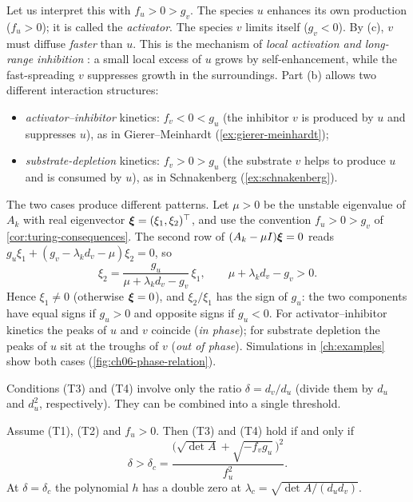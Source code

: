 Let us interpret this with $f_u>0>g_v$. The species $u$ enhances its own production
($f_u>0$); it is called the \emph{activator}. The species $v$ limits itself
($g_v<0$). By (c), $v$ must diffuse \emph{faster} than $u$. This is the mechanism of
\emph{local activation and long-range inhibition} \cite{GiererMeinhardt1972}: a small
local excess of $u$ grows by self-enhancement, while the fast-spreading $v$
suppresses growth in the surroundings. Part (b) allows two different interaction
structures:
\begin{itemize}
  \item \emph{activator--inhibitor} kinetics: $f_v<0<g_u$ (the inhibitor $v$ is
        produced by $u$ and suppresses $u$), as in Gierer--Meinhardt
        (\cref{ex:gierer-meinhardt});
  \item \emph{substrate-depletion} kinetics: $f_v>0>g_u$ (the substrate $v$ helps
        to produce $u$ and is consumed by $u$), as in Schnakenberg
        (\cref{ex:schnakenberg}).
\end{itemize}

\begin{remark}\label{rem:turing-phase}
The two cases produce different patterns. Let $\mu>0$ be the unstable eigenvalue of
$A_k$ with real eigenvector $\boldsymbol{\xi}=(\xi_1,\xi_2)^{\top}$, and use the convention
$f_u>0>g_v$ of \cref{cor:turing-consequences}. The second row of
$(A_k-\mu I)\boldsymbol{\xi}=0$ reads $g_u\xi_1 + (g_v-\lambda_kd_v-\mu)\xi_2=0$, so
\begin{equation*}
  \xi_2 = \frac{g_u}{\mu+\lambda_kd_v-g_v}\,\xi_1,
  \qquad \mu+\lambda_kd_v-g_v>0 .
\end{equation*}
Hence $\xi_1\neq0$ (otherwise $\boldsymbol{\xi}=0$), and $\xi_2/\xi_1$ has the sign of $g_u$:
the two components have equal signs if $g_u>0$ and opposite signs if $g_u<0$.
For activator--inhibitor kinetics the
peaks of $u$ and $v$ coincide (\emph{in phase}); for substrate depletion the peaks of
$u$ sit at the troughs of $v$ (\emph{out of phase}). Simulations in
\cref{ch:examples} show both cases (\cref{fig:ch06-phase-relation}).
\end{remark}

Conditions (T3) and (T4) involve only the ratio $\delta=d_v/d_u$ (divide them by $d_u$
and $d_u^2$, respectively). They can be combined into a single threshold.

\begin{theorem}\label{thm:critical-ratio}
Assume (T1), (T2) and $f_u>0$. Then (T3) and (T4) hold if and only if
\begin{equation*}
  \delta > \delta_c = \frac{\big(\sqrt{\det A}+\sqrt{-f_vg_u}\,\big)^2}{f_u^2}.
\end{equation*}
At $\delta=\delta_c$ the polynomial $h$ has a double zero at
$\lambda_c=\sqrt{\det A/(d_ud_v)}$.
\end{theorem}

